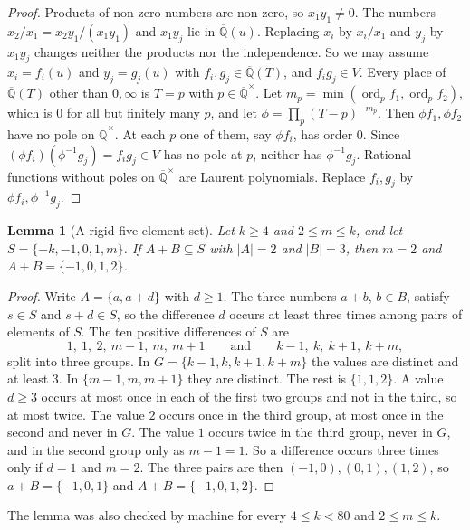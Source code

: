 \documentclass[11pt,a4paper]{article}
\theoremstyle{plain}
\newtheorem{lemma}[theorem]{Lemma}
\theoremstyle{definition}
\newcommand{\Qbar}{\overline{\mathbb{Q}}}
\newcommand{\ord}{\operatorname{ord}}
\begin{document}
\begin{proof}
Products of non-zero numbers are non-zero, so $x_{1}y_{1}\neq0$. The numbers
$x_{2}/x_{1}=x_{2}y_{1}/(x_{1}y_{1})$ and $x_{1}y_{j}$ lie in $\Qbar(u)$. Replacing $x_{i}$
by $x_{i}/x_{1}$ and $y_{j}$ by $x_{1}y_{j}$ changes neither the products nor the
independence. So we may assume $x_{i}=f_{i}(u)$ and $y_{j}=g_{j}(u)$ with
$f_{i},g_{j}\in\Qbar(T)$, and $f_{i}g_{j}\in V$. Every place of $\Qbar(T)$ other than
$0,\infty$ is $T=p$ with $p\in\Qbar^{\times}$. Let
$m_{p}=\min(\ord_{p}f_{1},\ord_{p}f_{2})$, which is $0$ for all but finitely many $p$, and
let $\phi=\prod_{p}(T-p)^{-m_{p}}$. Then $\phi f_{1},\phi f_{2}$ have no pole on
$\Qbar^{\times}$. At each $p$ one of them, say $\phi f_{i}$, has order $0$. Since
$(\phi f_{i})(\phi^{-1}g_{j})=f_{i}g_{j}\in V$ has no pole at $p$, neither has
$\phi^{-1}g_{j}$. Rational functions without poles on $\Qbar^{\times}$ are Laurent
polynomials. Replace $f_{i},g_{j}$ by $\phi f_{i},\phi^{-1}g_{j}$.
\end{proof}

\begin{lemma}[A rigid five-element set]\label{lem:combinatorics}
Let $k\ge4$ and $2\le m\le k$, and let $S=\{-k,-1,0,1,m\}$. If $A+B\subseteq S$ with
$|A|=2$ and $|B|=3$, then $m=2$ and $A+B=\{-1,0,1,2\}$.
\end{lemma}

\begin{proof}
Write $A=\{a,a+d\}$ with $d\ge1$. The three numbers $a+b$, $b\in B$, satisfy $s\in S$
and $s+d\in S$, so the difference $d$ occurs at least three times among pairs of
elements of $S$. The ten positive differences of $S$ are
\[
  1,\ 1,\ 2,\ m-1,\ m,\ m+1\qquad\text{and}\qquad k-1,\ k,\ k+1,\ k+m,
\]
split into three groups. In $G=\{k-1,k,k+1,k+m\}$ the values are distinct and at least
$3$. In $\{m-1,m,m+1\}$ they are distinct. The rest is $\{1,1,2\}$. A value
$d\ge3$ occurs at most once in each of the first two groups and not in the third, so
at most twice. The value $2$ occurs once in the third group, at most once in the second
and never in $G$. The value $1$ occurs twice in the third group, never in $G$, and in
the second group only as $m-1=1$. So a difference occurs three times only if $d=1$ and
$m=2$. The three pairs are then $(-1,0),(0,1),(1,2)$, so $a+B=\{-1,0,1\}$ and
$A+B=\{-1,0,1,2\}$.
\end{proof}

The lemma was also checked by machine for every $4\le k<80$ and $2\le m\le k$.
\end{document}
